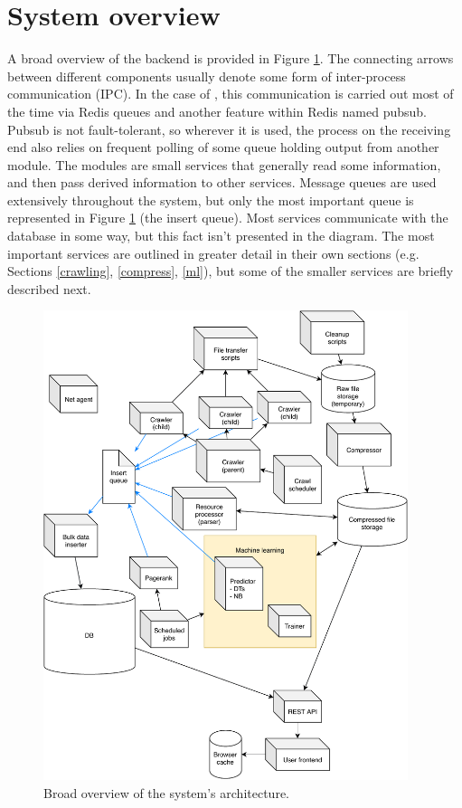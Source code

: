 \section{System overview\label{overview}}

A broad overview of the \nr{} backend is provided in Figure
\ref{overview-fig}.  The connecting arrows between different components
usually denote some form of inter-process communication (IPC).  In the
case of \nr{}, this communication is carried out most of the time via
Redis queues and another feature within Redis named pubsub.  Pubsub
is not fault-tolerant, so wherever it is used, the process on
the receiving end also relies on frequent polling of some queue holding
output from another module.  The modules are small services that
generally read some information, and then pass derived information to
other services.  Message queues are used extensively
throughout the system, but only the most important queue is represented
in Figure \ref{overview-fig} (the insert queue).  Most services
communicate with the database in some way, but this fact isn't
presented in the diagram.
The most important services
are outlined in greater detail in their own sections
(e.g. Sections \ref{crawling}, \ref{compress}, \ref{ml}), but some
of the smaller services are briefly described next.

\begin{figure}
    \centering
    \includegraphics[width=0.95\textwidth]{media/system}
    \caption{
        Broad overview of the system's
        architecture.\label{overview-fig}
    }
\end{figure}


